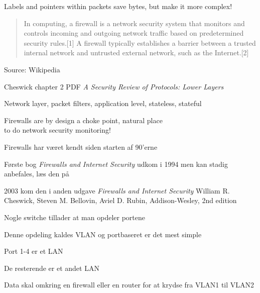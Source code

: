 \documentclass[Screen16to9,17pt]{foils}
\begin{document}
\vskip 1cm
\centerline{Labels and pointers within packets save bytes, but make it more complex!}



\begin{quote}
In computing, a firewall is a network security system that monitors and controls incoming and outgoing network traffic based on predetermined security rules.[1] A firewall typically establishes a barrier between a trusted internal network and untrusted external network, such as the Internet.[2]
\end{quote} Source: Wikipedia

\begin{list2}
\item {}
\item {} Cheswick chapter 2 PDF
\emph{A Security Review of Protocols:
Lower Layers}
\item Network layer, packet filters, application level, stateless, stateful
\end{list2}

Firewalls are by design a choke point, natural place \\
to do network security monitoring!




\begin{list1}
\item Firewalls har været kendt siden starten af 90'erne
\item Første bog \emph{Firewalls and Internet Security} udkom i 1994 men kan stadig anbefales, læs den på 

\item 2003 kom den i anden udgave \emph{Firewalls and Internet Security}
William R. Cheswick, Steven M. Bellovin, Aviel D. Rubin,
Addison-Wesley, 2nd edition
\end{list1}





\begin{list1}
\item Nogle switche tillader at man opdeler portene
\item Denne opdeling kaldes VLAN og portbaseret er det mest simple
\item Port 1-4 er et LAN
\item De resterende er et andet LAN
\item Data skal omkring en firewall eller en router for at krydse fra VLAN1 til VLAN2
\end{list1}
\end{document}
